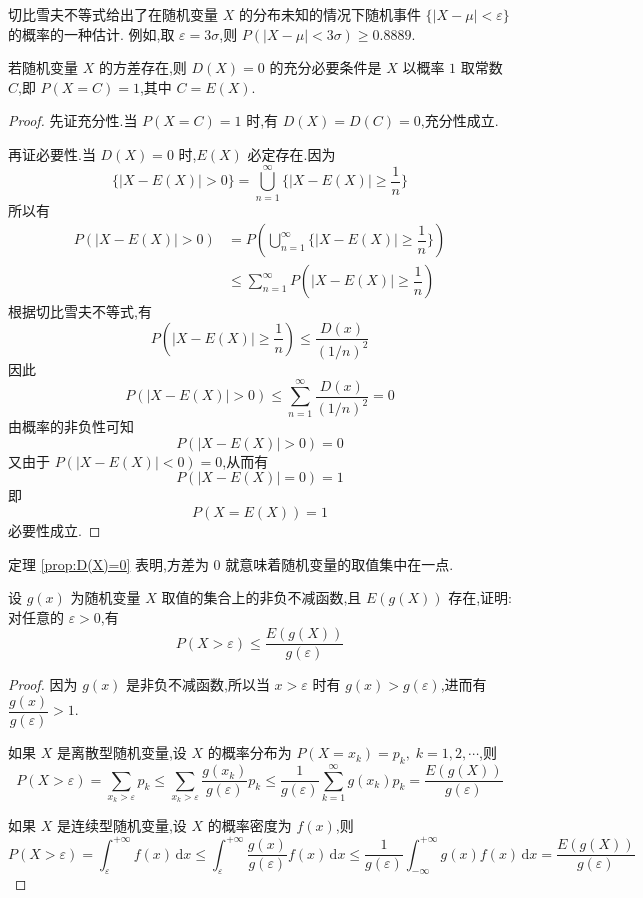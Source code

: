 切比雪夫不等式给出了在随机变量 $X$ 的分布未知的情况下随机事件 $\{ |X-\mu| < \varepsilon \}$ 的概率的一种估计. 例如,取 $\varepsilon = 3\sigma$,则 $P(|X-\mu| < 3\sigma) \geqslant 0.8889$.

\begin{theorem}[][][prop:D(X)=0]
    \indent 若随机变量 $X$ 的方差存在,则 $D(X)=0$ 的充分必要条件是 $X$ 以概率 $1$ 取常数 $C$,即 $P(X=C)=1$,其中 $C=E(X)$.
\end{theorem}

\begin{proof}
    先证充分性.当 $P(X=C)=1$ 时,有 $D(X)=D(C)=0$,充分性成立.

    再证必要性.当 $D(X)=0$ 时,$E(X)$ 必定存在.因为
    $$
    \{ |X-E(X)|>0 \} = \bigcup_{n=1}^{\infty} \{ |X-E(X)| \geqslant \dfrac{1}{n} \}
    $$
    所以有
    $$
    \begin{aligned}
        P(|X-E(X)|>0) &= P \left( \bigcup_{n=1}^{\infty} \{ |X-E(X)| \geqslant \dfrac{1}{n} \} \right) \\
        & \leqslant \sum_{n=1}^{\infty} P(|X-E(X)| \geqslant \dfrac{1}{n})
    \end{aligned}
    $$
    根据切比雪夫不等式,有
    $$
    P(|X-E(X)| \geqslant \dfrac{1}{n}) \leqslant \dfrac{D(x)}{(1/n)^2}
    $$
    因此
    $$
    P(|X-E(X)|>0) \leqslant \sum_{n=1}^{\infty} \dfrac{D(x)}{(1/n)^2} = 0
    $$
    由概率的非负性可知
    $$
    P(|X-E(X)|>0) = 0
    $$
    又由于 $P(|X-E(X)|<0) = 0$,从而有
    $$
    P(|X-E(X)|=0) = 1
    $$
    即
    $$
    P(X=E(X)) = 1
    $$
    必要性成立.
\end{proof}

定理 \ref{prop:D(X)=0} 表明,方差为 $0$ 就意味着随机变量的取值集中在一点.

\begin{example}
    \indent 设 $g(x)$ 为随机变量 $X$ 取值的集合上的非负不减函数,且 $E(g(X))$ 存在,证明:对任意的 $\varepsilon > 0$,有
    $$
    P(X > \varepsilon) \leqslant \dfrac{E(g(X))}{g(\varepsilon)}
    $$
\end{example}

\begin{proof}
    因为 $g(x)$ 是非负不减函数,所以当 $x > \varepsilon$ 时有 $g(x) > g(\varepsilon)$,进而有 $\dfrac{g(x)}{g(\varepsilon)} > 1$.

    如果 $X$ 是离散型随机变量,设 $X$ 的概率分布为 $P(X = x_k) = p_k, \; k=1,2,\cdots$,则
    $$
    P(X > \varepsilon) = \sum_{x_k > \varepsilon} p_k \leqslant \sum_{x_k > \varepsilon} \dfrac{g(x_k)}{g(\varepsilon)} p_k \leqslant \dfrac{1}{g(\varepsilon)} \sum_{k=1}^{\infty} g(x_k) p_k = \dfrac{E(g(X))}{g(\varepsilon)}
    $$

    如果 $X$ 是连续型随机变量,设 $X$ 的概率密度为 $f(x)$,则
    $$
    P(X > \varepsilon) = \int_{\varepsilon}^{+\infty} f(x)\,\text{d}x \leqslant \int_{\varepsilon}^{+\infty} \dfrac{g(x)}{g(\varepsilon)} f(x)\,\text{d}x \leqslant \dfrac{1}{g(\varepsilon)} \int_{-\infty}^{+\infty} g(x) f(x)\,\text{d}x = \dfrac{E(g(X))}{g(\varepsilon)}
    $$
\end{proof}


